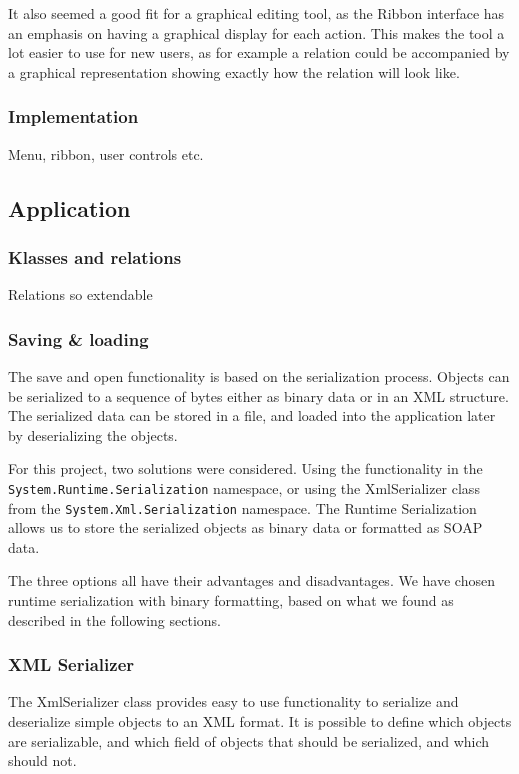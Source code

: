 It also seemed a good fit for a graphical editing tool, as the Ribbon interface
has an emphasis on having a graphical display for each action. This makes the
tool a lot easier to use for new users, as for example a relation could be
accompanied by a graphical representation showing exactly how the relation will
look like.
\subsubsection{Implementation}
Menu, ribbon, user controls etc.


\subsection{Application}
\subsubsection{Klasses and relations}
Relations so extendable

\subsubsection{Saving \& loading}
The save and open functionality is based on the serialization process. Objects can be serialized to a sequence of bytes either as binary data or in an XML structure. The serialized data can be stored in a file, and loaded into the application later by deserializing the objects.

For this project, two solutions were considered. Using the functionality in the \texttt{System.Runtime.Serialization} namespace, or using the XmlSerializer class from the \texttt{System.Xml.Serialization} namespace. The Runtime Serialization allows us to store the serialized objects as binary data or formatted as SOAP data.

The three options all have their advantages and disadvantages. We have chosen runtime serialization with binary formatting, based on what we found as described in the following sections.

\subsubsection{XML Serializer}
The XmlSerializer class provides easy to use functionality to serialize and deserialize simple objects to an XML format. It is possible to define which objects are serializable, and which field of objects that should be serialized, and which should not.

